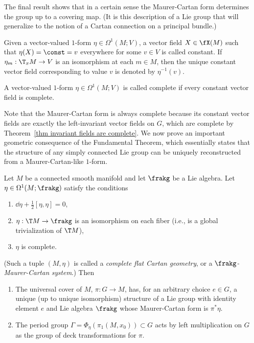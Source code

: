 The final result shows that in a certain sense the Maurer-Cartan form determines the group up to a covering map. (It is this description of a Lie group that will generalize to the notion of a Cartan connection on a principal bundle.)

\begin{defn}\label{def constant vector field}
    Given a vector-valued $1$-form $\eta\in\Omega^1(M;V)$, a vector field $X\in\fX(M)$ such that $\eta(X)=\const=v$ everywhere for some $v\in V$ is called constant. If $\eta_m:\T_x M\to V$ is an isomorphism at each $m\in M$, then the unique constant vector field corresponding to value $v$ is denoted by $\eta^{-1}(v)$.
\end{defn}
\begin{defn}\label{def complete form}
    A vector-valued $1$-form $\eta\in\Omega^1(M;V)$ is called complete if every constant vector field is complete.
\end{defn}

Note that the Maurer-Cartan form is always complete because its constant vector fields are exactly the left-invariant vector fields on $G$, which are complete by Theorem~\ref{thm invariant fields are complete}. We now prove an important geometric consequence of the Fundamental Theorem, which essentially states that the structure of any simply connected Lie group can be uniquely reconstructed from a Maurer-Cartan-like $1$-form.


\begin{thm}\label{thm 8.7 Sharpe}
    Let $M$ be a connected smooth manifold and let $\frakg$ be a Lie algebra. Let $\eta\in\Omega^1(M;\frakg)$ satisfy the conditions
    \begin{enumerate}[label=(\roman*)]
        \item $\dd\eta+\frac12[\eta,\eta]=0$,
        \item $\eta:\T M\to \frakg$ is an isomorphism on each fiber (i.e., is a global trivialization of $\T M$),
        \item $\eta$ is complete.
    \end{enumerate}
    (Such a tuple $(M,\eta)$ is called a \emph{complete flat Cartan geometry}, or a \emph{$\frakg$-Maurer-Cartan system}.)
    Then
    \begin{enumerate}[label=(\alph*)]
        \item The universal cover of $M$, $\pi:G\to M$, has, for an arbitrary choice $e\in G$, a unique (up to unique isomorphism) structure of a Lie group with identity element $e$ and Lie algebra $\frakg$ whose Maurer-Cartan form is $\pi^\ast\eta$.
        \item The period group $\Gamma=\Phi_\eta(\pi_1(M,x_0))\subset G$ acts by left multiplication on $G$ as the group of deck transformations for $\pi$.
    \end{enumerate}
\end{thm}

